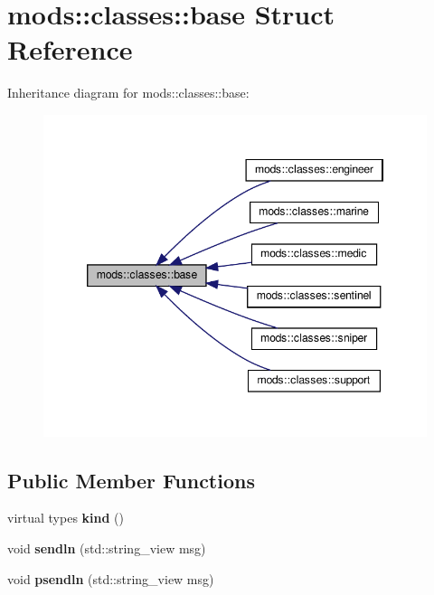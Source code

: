 \hypertarget{structmods_1_1classes_1_1base}{}\section{mods\+:\+:classes\+:\+:base Struct Reference}
\label{structmods_1_1classes_1_1base}


Inheritance diagram for mods\+:\+:classes\+:\+:base\+:
\nopagebreak
\begin{figure}[H]
\begin{center}
\leavevmode
\includegraphics[width=346pt]{structmods_1_1classes_1_1base__inherit__graph}
\end{center}
\end{figure}
\subsection*{Public Member Functions}
\begin{DoxyCompactItemize}
\item 
\mbox{\label{structmods_1_1classes_1_1base_a16c5756e82a8b0733db6306cdfd0f687}} 
virtual types {\bfseries kind} ()
\item 
\mbox{\label{structmods_1_1classes_1_1base_a9e0fa6e4ba9bc3b6931976fc0787379f}} 
void {\bfseries sendln} (std\+::string\+\_\+view msg)
\item 
\mbox{\label{structmods_1_1classes_1_1base_aa759d2a62a44a4c76c1ffdcfb5f2a185}} 
void {\bfseries psendln} (std\+::string\+\_\+view msg)
\end{DoxyCompactItemize}
